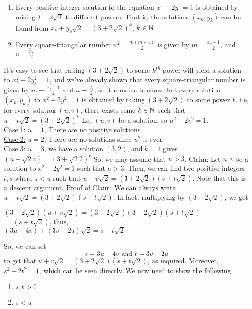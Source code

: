 \documentclass[../main.tex]{subfiles}
\begin{document}
\begin{thm}
    \begin{enumerate}
        \item Every positive integer solution to the equation $x^2-2y^2=1$ is obtained by raising $3+2\sqrt{2}$ to different powers. That is, the solutions $(x_k,y_k)$ can be found from $x_k+y_k\sqrt{2}=(3+2\sqrt{2})^k$, $k \in \mathbb{N}$
        \item Every square-triangular number $n^2=\tfrac{m(m+1)}{2}$ is given by $m=\tfrac{x_k-1}{2}$, and $n=\tfrac{y_k}{2}$
    \end{enumerate}
\end{thm}
\begin{pf}
    It's easy to see that raising $(3+2\sqrt{2})$ to some $k^{th}$ power will yield a solution to $x_k^2-2y_k^2=1$, and we've already shown that every square-triangular number is given by $m=\tfrac{x_k-1}{2}$ and $n=\tfrac{y_k}{2}$, so it remains to show that every solution $(x_k,y_k)$ to $x^2-2y^2=1$ is obtained by taking $(3+2\sqrt{2})$ to some power $k$. i.e, for every solution $(u,v)$, there exists some $k \in \mathbb{N}$ such that $u+v\sqrt{2}=(3+2\sqrt{2})^k$ \sspace
    Let $(u,v)$ be a solution, so $u^2-2v^2=1$. \\
    \underline{Case 1:} $u=1$, There are no positive solutions \\
    \underline{Case 2:} $u=2$, There are no solutions since $u^2$ is even \\
    \underline{Case 3:} $u=3$, we have a solution $(3,2)$, and $k=1$ gives $(u+\sqrt{2}v)=(3+\sqrt{2}2)^k$ 
    So, we may assume that $u > 3$. \sspace
    Claim: Let $u,v$ be a solution to $x^2-2y^2=1$ such that $u>3$. Then, we can find two positive integers $t,s$ where $s < u$ such that $u+v\sqrt{2}=(3+2\sqrt{2})(s+t\sqrt{2})$. Note that this is a descent argument. \sspace
    Proof of Claim: We can always write $u+v\sqrt{2}=(3+2\sqrt{2})(s+t\sqrt{2})$. In fact, multiplying by $(3-2\sqrt{2})$, we get
    \begin{center}
        $(3-2\sqrt{2})(u+v\sqrt{2})=(3-2\sqrt{2})(3+2\sqrt{2})(s+t\sqrt{2})$ \\
        $=(s+t\sqrt{2})$, thus, \\
        $(3u-4v)+(3v-2u)\sqrt{2}=s+t\sqrt{2}$
    \end{center}
    So, we can set $$s=3u-4v\text{ and }t=3v-2u$$ to get that $u+v\sqrt{2}=(3+2\sqrt{2})(s+t\sqrt{2})$, as required. Moreover, $s^2-2t^2=1$, which can be seen directly. We now need to show the following
    \begin{enumerate}
        \item $s,t > 0$
        \item $s < u$
    \end{enumerate}
\end{pf}
\end{document}
